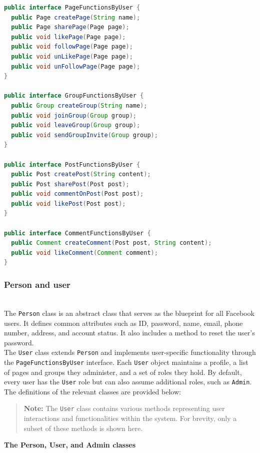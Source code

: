 \begin{lstlisting}[language=Java]
public interface PageFunctionsByUser {
  public Page createPage(String name);
  public Page sharePage(Page page);
  public void likePage(Page page);
  public void followPage(Page page);
  public void unLikePage(Page page);
  public void unFollowPage(Page page);
}

public interface GroupFunctionsByUser {
  public Group createGroup(String name);
  public void joinGroup(Group group);
  public void leaveGroup(Group group);
  public void sendGroupInvite(Group group);
}

public interface PostFunctionsByUser {
  public Post createPost(String content);
  public Post sharePost(Post post);
  public void commentOnPost(Post post);
  public void likePost(Post post);
}

public interface CommentFunctionsByUser {
  public Comment createComment(Post post, String content);
  public void likeComment(Comment comment);
}
\end{lstlisting}

\subsubsection{Person and user}\label{a-GjKp6-VT6SMnzmDC3jh}
\\
The \texttt{Person} class is an abstract class that serves as the blueprint for all Facebook users. It defines common attributes such as ID, password, name, email, phone number, address, and account status. It also includes a method to reset the user's password.
\\
The \texttt{User} class extends \texttt{Person} and implements user-specific functionality through the \texttt{PageFunctionsByUser} interface. Each
\texttt{User} object maintains a profile, a list of pages and groups they administer, and a set of roles they hold. By default, every user has the \texttt{User} role but can also assume additional roles, such as \texttt{Admin}. The definitions of the relevant classes are provided below:
\begin{quote}
\textbf{Note:} The \texttt{User} class contains various methods representing user interactions and functionalities within the system. For brevity, only a subset of these methods is shown here.
\end{quote}

\textbf{The Person, User, and Admin classes}

